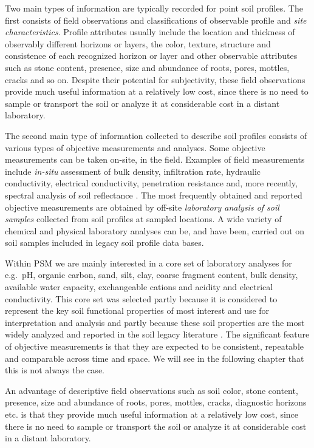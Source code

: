 \documentclass[11pt]{krantz}
\makeatletter
\newenvironment{kframe}{%
\medskip{}
\setlength{\fboxsep}{.8em}
 \def\at@end@of@kframe{}%
 \ifinner\ifhmode%
  \def\at@end@of@kframe{\end{minipage}}%
  \begin{minipage}{\columnwidth}%
 \fi\fi%
 \def\FrameCommand##1{\hskip\@totalleftmargin \hskip-\fboxsep
 \colorbox{shadecolor}{##1}\hskip-\fboxsep
     \hskip-\linewidth \hskip-\@totalleftmargin \hskip\columnwidth}%
 \MakeFramed {\advance\hsize-\width
   \@totalleftmargin\z@ \linewidth\hsize
   \@setminipage}}%
 {\par\unskip\endMakeFramed%
 \at@end@of@kframe}
\newenvironment{rmdblock}[1]
  {
  \begin{itemize}
  \renewcommand{\labelitemi}{
    \raisebox{-.7\height}[0pt][0pt]{
      {\setkeys{Gin}{width=3em,keepaspectratio}\texttt{[image: images/\#1]}}
    }
  }
  \setlength{\fboxsep}{1em}
  \begin{kframe}
  \item
  }
  {
  \end{kframe}
  \end{itemize}
  }
\newenvironment{rmdnote}
  {\begin{rmdblock}{note}}
  {\end{rmdblock}}
\theoremstyle{definition}
\theoremstyle{definition}
\theoremstyle{definition}
\theoremstyle{remark}
\makeatother
\begin{document}
Two main types of information are typically recorded for point soil
profiles. The first consists of field observations and classifications
of observable profile and \emph{site characteristics}. Profile
attributes usually include the location and thickness of observably
different horizons or layers, the color, texture, structure and
consistence of each recognized horizon or layer and other observable
attributes such as stone content, presence, size and abundance of roots,
pores, mottles, cracks and so on. Despite their potential for
subjectivity, these field observations provide much useful information
at a relatively low cost, since there is no need to sample or transport
the soil or analyze it at considerable cost in a distant laboratory.

The second main type of information collected to describe soil profiles
consists of various types of objective measurements and analyses. Some
objective measurements can be taken on-site, in the field. Examples of
field measurements include \emph{in-situ} assessment of bulk density,
infiltration rate, hydraulic conductivity, electrical conductivity,
penetration resistance and, more recently, spectral analysis of soil
reflectance
\citep{kondolf2003tools, GehlRice2005, ShepherdWalsh2007JNIS}. The most
frequently obtained and reported objective measurements are obtained by
off-site \emph{laboratory analysis of soil samples} collected from soil
profiles at sampled locations. A wide variety of chemical and physical
laboratory analyses can be, and have been, carried out on soil samples
included in legacy soil profile data bases.

Within PSM we are mainly interested in a core set of laboratory analyses
for e.g.~pH, organic carbon, sand, silt, clay, coarse fragment content,
bulk density, available water capacity, exchangeable cations and acidity
and electrical conductivity. This core set was selected partly because
it is considered to represent the key soil functional properties of most
interest and use for interpretation and analysis and partly because
these soil properties are the most widely analyzed and reported in the
soil legacy literature
\citep{Sanchez2009Science, Hartemink2010Springer}. The significant
feature of objective measurements is that they are expected to be
consistent, repeatable and comparable across time and space. We will see
in the following chapter that this is not always the case.

\begin{rmdnote}
An advantage of descriptive field observations such as soil color, stone
content, presence, size and abundance of roots, pores, mottles, cracks,
diagnostic horizons etc. is that they provide much useful information at
a relatively low cost, since there is no need to sample or transport the
soil or analyze it at considerable cost in a distant laboratory.
\end{rmdnote}
\end{document}
